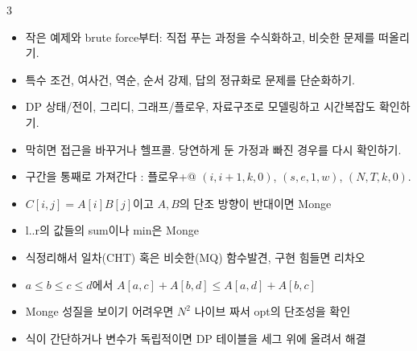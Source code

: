 \documentclass[landscape, 8pt, a4paper, oneside]{extarticle}
\begin{document}
\begin{multicols*}{3}
  
  \begin{itemize}
    \item 작은 예제와 brute force부터: 직접 푸는 과정을 수식화하고, 비슷한 문제를 떠올리기.
    \item 특수 조건, 여사건, 역순, 순서 강제, 답의 정규화로 문제를 단순화하기.
    \item DP 상태/전이, 그리디, 그래프/플로우, 자료구조로 모델링하고 시간복잡도 확인하기.
    \item 막히면 접근을 바꾸거나 헬프콜. 당연하게 둔 가정과 빠진 경우를 다시 확인하기.
    \item 구간을 통째로 가져간다 : 플로우+@ $(i,i+1,k,0)$, $(s,e,1,w)$, $(N,T,k,0)$.
  \end{itemize}
  
  \begin{itemize}
    \item $C[i,j]=A[i]B[j]$이고 $A,B$의 단조 방향이 반대이면 Monge
    \item l..r의 값들의 sum이나 min은 Monge
    \item 식정리해서 일차(CHT) 혹은 비슷한(MQ) 함수발견, 구현 힘들면 리차오
    \item $a \le b \le c \le d$에서 $A[a,c] + A[b,d] \le A[a,d] + A[b,c]$
    \item Monge 성질을 보이기 어려우면 $N^2$ 나이브 짜서 opt의 단조성을 확인
    \item 식이 간단하거나 변수가 독립적이면 DP 테이블을 세그 위에 올려서 해결
  \end{itemize}
  

\end{multicols*}
\end{document}
